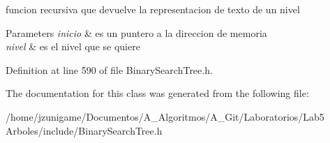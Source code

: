 funcion recursiva que devuelve la representacion de texto de un nivel 


\begin{DoxyParams}{Parameters}
{\em inicio} & es un puntero a la direccion de memoria \\
\hline
{\em nivel} & es el nivel que se quiere \\
\hline
\end{DoxyParams}


Definition at line 590 of file Binary\+Search\+Tree.\+h.



The documentation for this class was generated from the following file\+:\begin{DoxyCompactItemize}
\item 
/home/jzunigame/\+Documentos/\+A\+\_\+\+Algoritmos/\+A\+\_\+\+Git/\+Laboratorios/\+Lab5 Arboles/include/Binary\+Search\+Tree.\+h\end{DoxyCompactItemize}
